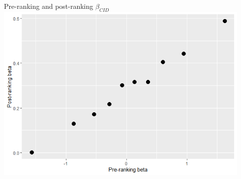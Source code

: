 \documentclass{beamer}
\begin{document}
\begin{frame}{Pre-ranking and post-ranking $\beta_{CID}$}
\includegraphics[width=0.94\textwidth]{paper_b3/Figure2_sl.png}
\end{frame}
\end{document}
